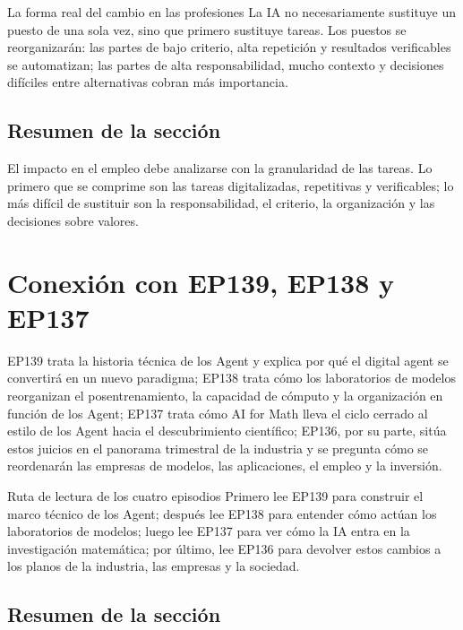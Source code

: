\documentclass[a4paper]{article}
\begin{document}
\begin{importantbox}{La forma real del cambio en las profesiones}
La IA no necesariamente sustituye un puesto de una sola vez, sino que primero sustituye tareas. Los puestos se reorganizarán: las partes de bajo criterio, alta repetición y resultados verificables se automatizan; las partes de alta responsabilidad, mucho contexto y decisiones difíciles entre alternativas cobran más importancia.
\end{importantbox}

\subsection{Resumen de la sección}

El impacto en el empleo debe analizarse con la granularidad de las tareas. Lo primero que se comprime son las tareas digitalizadas, repetitivas y verificables; lo más difícil de sustituir son la responsabilidad, el criterio, la organización y las decisiones sobre valores.
\section{Conexión con EP139, EP138 y EP137}

EP139 trata la historia técnica de los Agent y explica por qué el digital agent se convertirá en un nuevo paradigma; EP138 trata cómo los laboratorios de modelos reorganizan el posentrenamiento, la capacidad de cómputo y la organización en función de los Agent; EP137 trata cómo AI for Math lleva el ciclo cerrado al estilo de los Agent hacia el descubrimiento científico; EP136, por su parte, sitúa estos juicios en el panorama trimestral de la industria y se pregunta cómo se reordenarán las empresas de modelos, las aplicaciones, el empleo y la inversión.

\begin{knowledgebox}{Ruta de lectura de los cuatro episodios}
Primero lee EP139 para construir el marco técnico de los Agent; después lee EP138 para entender cómo actúan los laboratorios de modelos; luego lee EP137 para ver cómo la IA entra en la investigación matemática; por último, lee EP136 para devolver estos cambios a los planos de la industria, las empresas y la sociedad.
\end{knowledgebox}

\subsection{Resumen de la sección}
\end{document}
